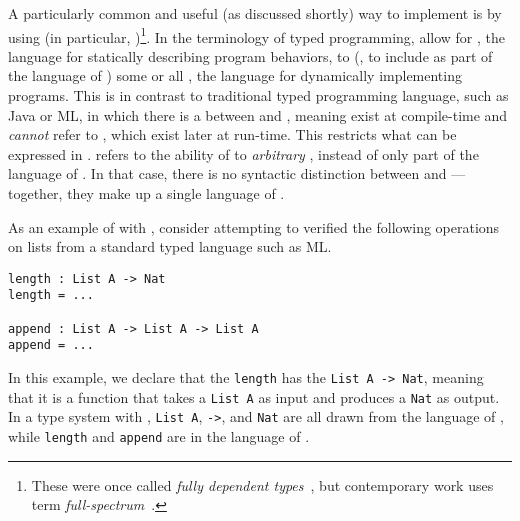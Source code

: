 A particularly common and useful (as discussed shortly) way to implement
 is by using \emph{} (in
particular, \emph{} )\footnote{These
  were once called \emph{fully dependent types}~\cite{xi1998}, but contemporary
  work uses term \emph{full-spectrum}~\cite{weirich2017}.}.
In the terminology of typed programming,  allow for
, the language for statically describing
program behaviors, to  (\ie, to include as part of the
language of ) some or all ,
the language for dynamically implementing programs.
This is in contrast to traditional typed programming language, such as Java or
ML, in which there is a  between  and
, meaning  exist at compile-time and \emph{cannot} refer
to , which exist later at run-time.
This restricts what  can be expressed in .
%
 
refers to the ability of  to  \emph{arbitrary}
, instead of only part of the language of .
In that case, there is no syntactic distinction between  and
---together, they make up a single language of
.

As an example of  with ,
consider attempting to verified the following operations on lists from a
standard typed language such as ML.
\begin{verbatim}
length : List A -> Nat
length = ...

append : List A -> List A -> List A
append = ...
\end{verbatim}
In this example, we declare that the  \texttt{length} has
the  \texttt{List A -> Nat}, meaning that it is a function
that takes a \texttt{List A} as input and produces a
\texttt{Nat} as output.
In a type system with , \texttt{List A},
\texttt{->}, and \texttt{Nat} are all drawn from the
language of , while \texttt{length} and
\texttt{append} are in the language of .


